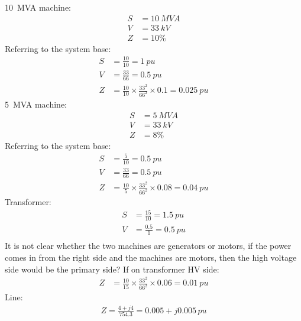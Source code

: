 \SI{10}{MVA} machine:
\begin{align}
    S & = \SI{10}{MVA} \\
    V & = \SI{33}{kV}  \\
    Z & = 10\%
\end{align}
Referring to the system base:
\begin{align}
    S & = \frac{10}{10} = \SI{1}{pu}                                       \\
    V & = \frac{33}{66} = \SI{0.5}{pu}                                     \\
    Z & = \frac{10}{10}\times \frac{33^2}{66^2}\times 0.1 = \SI{0.025}{pu}
\end{align}
\SI{5}{MVA} machine:
\begin{align}
    S & = \SI{5}{MVA} \\
    V & = \SI{33}{kV} \\
    Z & = 8\%
\end{align}
Referring to the system base:
\begin{align}
    S & = \frac{5}{10} = \SI{0.5}{pu}                                      \\
    V & = \frac{33}{66} = \SI{0.5}{pu}                                     \\
    Z & = \frac{10}{5}\times \frac{33^2}{66^2} \times 0.08 = \SI{0.04}{pu}
\end{align}
Transformer:
\begin{align}
    S & = \frac{15}{10} = \SI{1.5}{pu} \\
    V & = \frac{0.5}{1} = \SI{0.5}{pu} \\
\end{align}
It is not clear whether the two machines are generators or motors, if the power comes in from the right side and the machines are motors, then the high voltage side would be the primary side? If on transformer HV side:
\begin{align}
    Z & = \frac{10}{15}\times \frac{33^2}{66^2} \times 0.06 = \SI{0.01}{pu}
\end{align}
Line:
\begin{gather}
    Z = \frac{4+j4}{754.3} = 0.005 + j0.005\,\si{pu}
\end{gather}
